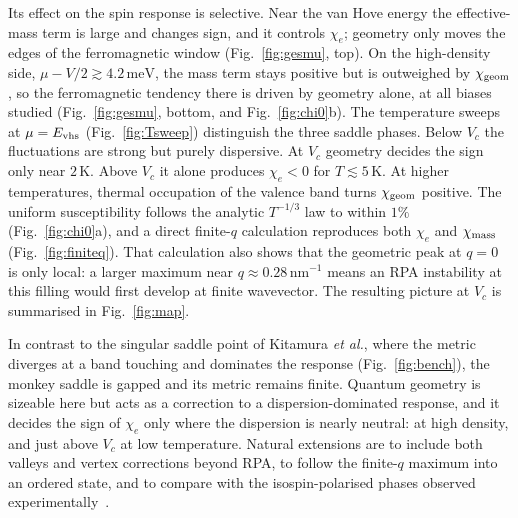 \documentclass[11pt,a4paper]{article}
\numberwithin{equation}{section}
\newcommand{\chie}{\chi_{e}}
\newcommand{\chig}{\chi_{\rm geom}}
\newcommand{\chim}{\chi_{\rm mass}}
\newcommand{\Evhs}{E_{\rm vhs}}
\newcommand{\meV}{\,\mathrm{meV}}
\newcommand{\nm}{\,\mathrm{nm}}
\begin{document}
Its effect on the spin response is selective. Near the van Hove energy the effective-mass term is large and changes sign, and it controls $\chie$; geometry only moves the edges of the ferromagnetic window (Fig.~\ref{fig:gesmu}, top). On the high-density side, $\mu-V/2\gtrsim4.2\meV$, the mass term stays positive but is outweighed by $\chig$, so the ferromagnetic tendency there is driven by geometry alone, at all biases studied (Fig.~\ref{fig:gesmu}, bottom, and Fig.~\ref{fig:chi0}b). The temperature sweeps at $\mu=\Evhs$ (Fig.~\ref{fig:Tsweep}) distinguish the three saddle phases. Below $V_c$ the fluctuations are strong but purely dispersive. At $V_c$ geometry decides the sign only near $2\,$K. Above $V_c$ it alone produces $\chie<0$ for $T\lesssim5\,$K. At higher temperatures, thermal occupation of the valence band turns $\chig$ positive. The uniform susceptibility follows the analytic $T^{-1/3}$ law to within $1\%$ (Fig.~\ref{fig:chi0}a), and a direct finite-$q$ calculation reproduces both $\chie$ and $\chim$ (Fig.~\ref{fig:finiteq}). That calculation also shows that the geometric peak at $q=0$ is only local: a larger maximum near $q\approx0.28\nm^{-1}$ means an RPA instability at this filling would first develop at finite wavevector. The resulting picture at $V_c$ is summarised in Fig.~\ref{fig:map}.

In contrast to the singular saddle point of Kitamura \emph{et al.}, where the metric diverges at a band touching and dominates the response (Fig.~\ref{fig:bench}), the monkey saddle is gapped and its metric remains finite. Quantum geometry is sizeable here but acts as a correction to a dispersion-dominated response, and it decides the sign of $\chie$ only where the dispersion is nearly neutral: at high density, and just above $V_c$ at low temperature. Natural extensions are to include both valleys and vertex corrections beyond RPA, to follow the finite-$q$ maximum into an ordered state, and to compare with the isospin-polarised phases observed experimentally~\cite{Zhou2022}.
\end{document}

